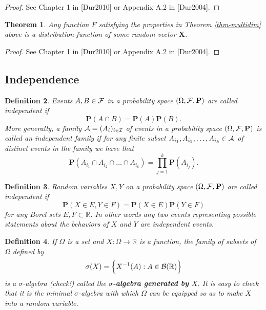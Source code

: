 \documentclass[12pt]{article}
\newtheorem{thm}{Theorem}[section]
\newtheorem{defi}[thm]{Definition}
\newcommand{\R}{\mathbb{R}}
\newcommand{\prob}{\mathbf{P}}
\theoremstyle{example}
\begin{document}
\begin{proof} See Chapter 1 in [Dur2010] or Appendix A.2 in [Dur2004].
\end{proof}

\begin{thm} Any function $F$ satisfying the properties in Theorem \ref{thm-multidim} above is a distribution function of some random vector $\mathbf{X}$.
\end{thm}

\begin{proof} See Chapter 1 in [Dur2010] or Appendix A.2 in [Dur2004].
\end{proof}

\subsection{Independence}





\begin{defi} Events $A, B \in {\cal F}$ in a probability space $(\Omega, {\cal F}, \prob)$ are called independent if
$$ \prob(A\cap B) = \prob(A)\prob(B). $$
More generally, a family ${\cal A}=(A_i)_{i\in {\cal I}}$ of events in a probability space $(\Omega, {\cal F}, \prob)$ is called an independent family if for any finite subset $A_{i_1}, A_{i_1}, \ldots, A_{i_k} \in {\cal A}$ of distinct events in the family we have that
$$ \prob(A_{i_1} \cap A_{i_2} \cap \ldots \cap A_{i_k}) = \prod_{j=1}^k \prob(A_{i_j}).
$$
\end{defi}

\begin{defi} Random variables $X, Y$ on a probability space $(\Omega, {\cal F}, \prob)$ are called independent if
$$ \prob(X \in E, Y \in F) = \prob(X\in E)\prob(Y\in F) $$
for any Borel sets $E,F \subset \R$. In other words any two events representing possible statements about the behaviors of $X$ and $Y$ are independent events.
\end{defi}

\begin{defi} If $\Omega$ is a set and $X:\Omega\to\R$ is a function, the family of subsets of $\Omega$ defined by
$$ \sigma(X) = \Big\{ X^{-1}(A) : A \in {\cal B}(\R) \Big\} $$
is a $\sigma$-algebra (check!) called the \textbf{$\sigma$-algebra generated by $X$}. It is easy to check that it is the minimal $\sigma$-algebra with which $\Omega$ can be equipped so as to make $X$ into a random variable.
\end{defi}
\end{document}
